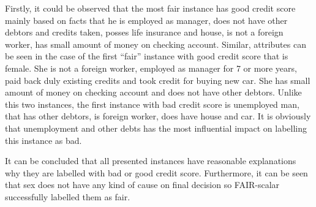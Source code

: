 \documentclass[preprint,12pt]{elsarticle}
\begin{document}
Firstly, it could be observed that the most fair instance has good credit score mainly based on facts that he is employed as manager, does not have other debtors and credits taken, posses life insurance and house, is not a foreign worker, has small amount of money on checking account. Similar, attributes can be seen in the case of the first ``fair'' instance with good credit score that is female. She is not a foreign worker, employed as manager for 7 or more years, paid back duly existing credits and took credit for buying new car. She has small amount of money on checking account and does not have other debtors. Unlike this two instances, the first instance with bad credit score is unemployed man, that has other debtors, is foreign worker, does have house and car. It is obviously that unemployment and other debts has the most influential impact on labelling this instance as bad.

It can be concluded that all presented instances have reasonable explanations why they are labelled with bad or good credit score. Furthermore, it can be seen that sex does not have any kind of cause on final decision so FAIR-scalar successfully labelled them as fair.
\end{document}
